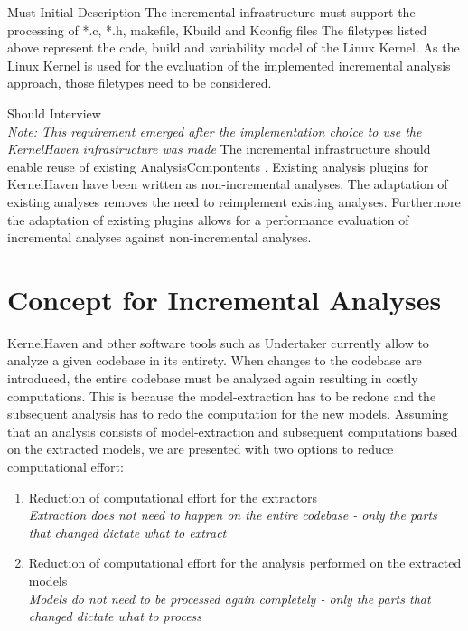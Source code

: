 \documentclass[a4paper]{article}
\begin{document}
\clearpage
\begin{req} \label{req:target-artifacts}
\reqtable
    {Must}  {Initial Description}
	{The incremental infrastructure must support the processing of *.c, *.h, makefile, Kbuild and Kconfig files}
	{The filetypes listed above represent the code, build and variability model of the Linux Kernel. As the Linux Kernel is used for the evaluation of the implemented incremental analysis approach, those filetypes need to be considered.}
\end{req}


\begin{req} \label{req:existing-analyses}
\reqtable
    {Should}  {Interview \\ \emph{Note: This requirement emerged after the implementation choice to use the KernelHaven infrastructure was made}}
	{The incremental infrastructure should enable reuse of existing AnalysisCompontents .}
	{Existing analysis plugins for KernelHaven have been written as non-incremental analyses. The adaptation of existing analyses removes the need to reimplement existing analyses. Furthermore the adaptation of existing plugins allows for a performance evaluation of incremental analyses against non-incremental analyses.}
\end{req}

\newpage

\section{Concept for Incremental Analyses}\label{concept}

KernelHaven and other software tools such as Undertaker\cite{Tartler:2011:FCC:1966445.1966451} currently allow to analyze a given codebase in its entirety. When changes to the codebase are introduced, the entire codebase must be analyzed again resulting in costly computations. This is because the model-extraction has to be redone and the subsequent analysis has to redo the computation for the new models. Assuming that an analysis consists of model-extraction and subsequent computations based on the extracted models, we are presented with two options to reduce computational effort:

\begin{enumerate}
	\item Reduction of computational effort for the extractors \\
	\emph{Extraction does not need to happen on the entire codebase - only the parts that changed dictate what to extract}
	\item Reduction of computational effort for the analysis performed on the extracted models \\
	\emph{Models do not need to be processed again completely - only the parts that changed dictate what to process}
\end{enumerate}
\end{document}
